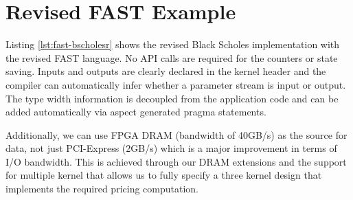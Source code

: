 \begin{comment}
\subsection{Support Designs with DRAM}
\label{sec:fast-dram}

Designs described
To support DRAM a dataflow design requires additional kernels that
generate memory commands asynchronously from the computational kernel.


\subsection{Run-time Reconfiguration Support}


To support run-time reconfiguration \fastc{} must know that
alternative partititions are to be generated for a function.
Additionally, boilerplate code for trigerring the run-time
reconfiguration needs to be added. This contains:
\begin{itemize}
\item code required to save current FPGA state -- this is required to
  prevent loss of data as a result of resetting the device as part of
  the run-time reconfiguration process
\item code on the CPU side to upload the new configuration
\item code on the CPU side to queue new input streams and start the
  computation
\end{itemize}

\end{comment}

\section{Revised FAST Example}
\label{sec:fast-ref}

Listing \ref{lst:fast-bscholesr} shows the revised Black Scholes
implementation with the revised FAST language. No API calls are
required for the counters or state saving. Inputs and outputs are
clearly declared in the kernel header and the compiler can
automatically infer whether a parameter stream is input or output. The
type width information is decoupled from the application code and can
be added automatically via aspect generated pragma statements.

Additionally, we can use FPGA DRAM (bandwidth of 40GB/s) as the source
for data, not just PCI-Express (2GB/s) which is a major improvement in
terms of I/O bandwidth. This is achieved through our DRAM extensions
and the support for multiple kernel that allows us to fully specify a
three kernel design that implements the required pricing computation.

